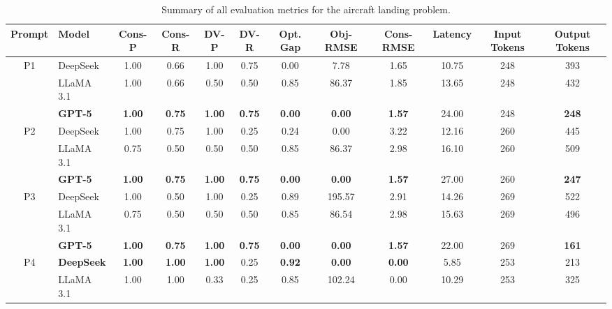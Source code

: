 \documentclass[review,12pt]{elsarticle}
\begin{document}
\begin{table}[htbp]
\centering
\caption{Summary of all evaluation metrics for the aircraft landing problem.}
\label{table:aircraft_landing_summary}
\renewcommand{\arraystretch}{0.9} %
\setlength{\tabcolsep}{2pt}      %
\scriptsize                       %

\begin{adjustbox}{max width=\textwidth}
\begin{tabular}{c l c c c c c c c c c c}
\toprule
\textbf{Prompt} & \textbf{Model} & \textbf{Cons-P} & \textbf{Cons-R} & \textbf{DV-P} & \textbf{DV-R} & \textbf{Opt. Gap} & \textbf{Obj-RMSE} & \textbf{Cons-RMSE} & \textbf{Latency} & \textbf{Input Tokens} & \textbf{Output Tokens} \\
\midrule
P1 & DeepSeek & 1.00 & 0.66 & 1.00 & 0.75 & 0.00 & 7.78 & 1.65 & 10.75 & 248 & 393 \\[-4pt]
   & LLaMA 3.1 & 1.00 & 0.66 & 0.50 & 0.50 & 0.85 & 86.37 & 1.85 & 13.65 & 248 & 432 \\[-4pt]
   & \textbf{GPT-5} & \textbf{1.00} & \textbf{0.75} & \textbf{1.00} & \textbf{0.75} & \textbf{0.00} & \textbf{0.00} & \textbf{1.57} & 24.00 & 248 & \textbf{248} \\
\midrule
P2 & DeepSeek & 1.00 & 0.75 & 1.00 & 0.25 & 0.24 & 0.00 & 3.22 & 12.16 & 260 & 445 \\[-4pt]
   & LLaMA 3.1 & 0.75 & 0.50 & 0.50 & 0.50 & 0.85 & 86.37 & 2.98 & 16.10 & 260 & 509 \\[-4pt]
   & \textbf{GPT-5} & \textbf{1.00} & \textbf{0.75} & \textbf{1.00} & \textbf{0.75} & \textbf{0.00} & \textbf{0.00} & \textbf{1.57} & 27.00 & 260 & \textbf{247} \\
\midrule
P3 & DeepSeek & 1.00 & 0.50 & 1.00 & 0.25 & 0.89 & 195.57 & 2.91 & 14.26 & 269 & 522 \\[-4pt]
   & LLaMA 3.1 & 0.75 & 0.50 & 0.50 & 0.50 & 0.85 & 86.54 & 2.98 & 15.63 & 269 & 496 \\[-4pt]
   & \textbf{GPT-5} & \textbf{1.00} & \textbf{0.75} & \textbf{1.00} & \textbf{0.75} & \textbf{0.00} & \textbf{0.00} & \textbf{1.57} & 22.00 & 269 & \textbf{161} \\
\midrule
P4 & \textbf{DeepSeek} & \textbf{1.00} & \textbf{1.00} & \textbf{1.00} & 0.25 & \textbf{0.92} & \textbf{0.00} & \textbf{0.00} & 5.85 & 253 & 213 \\[-4pt]
   & LLaMA 3.1 & 1.00 & 1.00 & 0.33 & 0.25 & 0.85 & 102.24 & 0.00 & 10.29 & 253 & 325 \\[-4pt]

\end{tabular}
\end{adjustbox}
\end{table}
\end{document}
